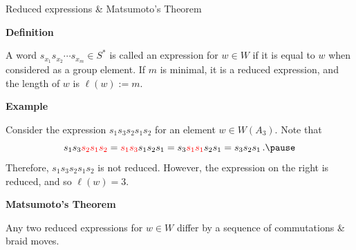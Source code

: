 \documentclass[10pt, compress,aspectratio=169,handout]{beamer}
\begin{document}
\begin{frame}{Reduced expressions \& Matsumoto's Theorem} \pause

\vspace{1em}

\begin{block}{\textbf{Definition}}

\vspace{-.5em}

A word $s_{x_1}s_{x_2}\cdots s_{x_m}\in S^{*}$ is called an \alert{expression} for $w\in W$ if it is equal to $w$ when considered as a group element. \pause If $m$ is minimal, it is a \alert{reduced expression}, and the \alert{length} of $w$ is $\ell(w):=m$.
\end{block}

\pause
    
\begin{block}{\textbf{Example}}

\vspace{-.5em}

Consider the expression $s_1s_3s_2s_1s_2$ for an element $w\in W(A_3)$. \pause Note that
\[
s_1s_3{\color{red}s_2s_1s_2}={\color{red}s_1s_3}s_1s_2s_1=s_3{\color{red}s_1s_1}s_2s_1=s_3s_2s_1\,. \pause
\]
Therefore, $s_1s_3s_2s_1s_2$ is not reduced.  However, the expression on the right is reduced, and so $\ell(w)=3$.
\end{block}

\pause

\begin{block}{\textbf{Matsumoto's Theorem}}

\vspace{-.5em}

Any two reduced expressions for $w\in W$ differ by a sequence of commutations \& braid moves.
\end{block}

\end{frame}

\end{document}
